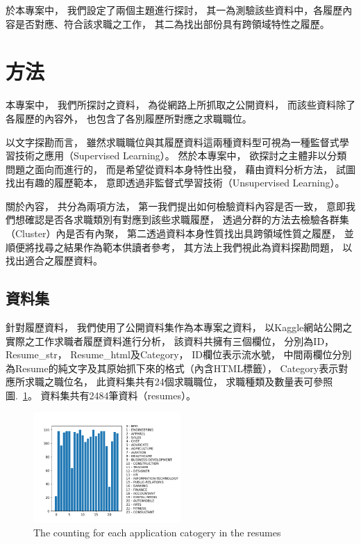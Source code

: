 \documentclass[sigconf]{acmart}
\begin{document}
於本專案中，
我們設定了兩個主題進行探討，
其一為測驗該些資料中，各履歷內容是否對應、符合該求職之工作，
其二為找出部份具有跨領域特性之履歷。

\section{方法}

本專案中，
我們所探討之資料，
為從網路上所抓取之公開資料，
而該些資料除了各履歷的內容外，
也包含了各別履歷所對應之求職職位。

以文字探勘而言，
雖然求職職位與其履歷資料這兩種資料型可視為一種監督式學習技術之應用（Supervised Learning）\cite{murphy2012machine}。
然於本專案中，
欲探討之主體非以分類問題之面向而進行的，
而是希望從資料本身特性出發，
藉由資料分析方法，
試圖找出有趣的履歷範本，
意即透過非監督式學習技術（Unsupervised Learning）\cite{murphy2012machine}。

關於內容，
共分為兩項方法，
第一我們提出如何檢驗資料內容是否一致，
意即我們想確認是否各求職類別有對應到該些求職履歷，
透過分群的方法去檢驗各群集（Cluster）內是否有內聚，
第二透過資料本身性質找出具跨領域性質之履歷，
並順便將找尋之結果作為範本供讀者參考，
其方法上我們視此為資料探勘問題\cite{han2011data}，
以找出適合之履歷資料。

\subsection{資料集}

針對履歷資料，
我們使用了公開資料集作為本專案之資料，
以Kaggle網站公開之實際之工作求職者履歷資料進行分析\cite{kaggle_dataset}，
該資料共擁有三個欄位，
分別為ID，
Resume\_str，
Resume\_html及Category，
ID欄位表示流水號，
中間兩欄位分別為Resume的純文字及其原始抓下來的格式（內含HTML標籤），
Category表示對應所求職之職位名，
此資料集共有24個求職職位，
求職種類及數量表可參照圖.~\ref{counter_of_application}。
資料集共有2484筆資料（resumes）。

\begin{figure}
    \centerline{\includegraphics[width=0.5\textwidth]{counter_of_application.png}}
    \caption{The counting for each application catogery in the resumes}
    \label{counter_of_application}
\end{figure}
\end{document}
